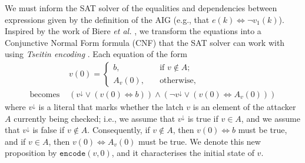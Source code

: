 {We must inform the SAT solver of the equalities and dependencies between expressions given by the definition of the AIG (e.g., that $e(k) \Leftrightarrow \lnot v_1(k)$). Inspired by the work of Biere \emph{et al.} \cite{BMCWithoutBDDs}, we transform the equations into a Conjunctive Normal Form formula (CNF) that the SAT solver can work with using  \emph{Tseitin encoding} \cite{TseitinEncoding}. Each equation of the form 
\begin{align*}
&v(0)= \begin{cases}
b, \quad &\text{if $v \not \in A$;}\\
A_v(0), \quad &\text{otherwise,}
\end{cases}
\\\text{becomes }
&{\left(v^{\downarrow} \lor (v(0) \Leftrightarrow b ) \right)\land \left(\lnot v^{\downarrow} \lor (v(0) \Leftrightarrow A_v(0)) \right)}
\end{align*}
where $v^{\downarrow}$ is a literal that marks whether the latch $v$ is an element of the attacker $A$ currently being checked; i.e., we assume that $v^{\downarrow}$ is true if $v\in A$, and we assume that $v^{\downarrow}$ is false if $v\not \in A$. Consequently, if $v\not \in A$, then $v(0) \Leftrightarrow b$ must be true, and if $v \in A$, then $v(0)  \Leftrightarrow A_v(0) $ must be true. We denote this new proposition by $\mathtt{encode}(v,0)$, and it characterises the initial state of $v$.

}
